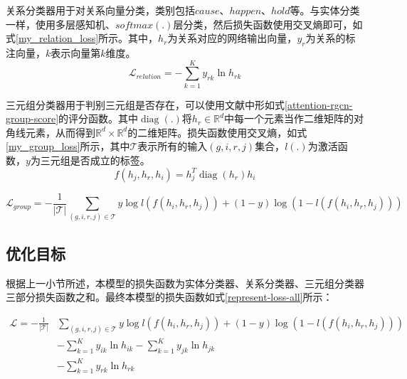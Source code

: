 关系分类器用于对关系向量分类，类别包括$cause$、$happen$、$hold$等。与实体分类一样，使用多层感知机、$softmax(.)$层分类，然后损失函数使用交叉熵即可，如式\ref{my_relation_loss}所示。其中，$h_r$为关系对应的网络输出向量，$y_r$为关系的标注向量，$k$表示向量第$k$维度。
\begin{equation}
    \mathcal{L}_{relation}=- \sum_{k=1}^{K} y_{r k} \ln h_{r k}
    \label{my_relation_loss}
\end{equation}

三元组分类器用于判别三元组是否存在，可以使用文献\parencite{trouillon2016complex}中形如式\ref{attention-rgcn-group-score}的评分函数。其中$\operatorname{diag}\left(.\right)$将$h_r\in\mathbb{R}^{d}$中每一个元素当作二维矩阵的对角线元素，从而得到$\mathbb{R}^{d}\times \mathbb{R}^{d}$的二维矩阵。损失函数使用交叉熵，如式\ref{my_group_loss}所示，其中$\mathcal{T}$表示所有的输入$(g, i, r, j)$集合，$l(.)$为激活函数，$y$为三元组是否成立的标签。
\begin{equation}
    f(h_{j}, h_{r}, h_{i})=h_{j}^{T} \operatorname{diag}\left(h_{r}\right) h_{i}
    \label{attention-rgcn-group-score}
\end{equation}

\begin{equation}
    \mathcal{L}_{group}= -\frac{1}{|\mathcal{T}|}  \sum_{(g, i, r, j) \in \mathcal{T}} y \log l(f(h_i, h_r, h_j))+(1-y) \log (1-l(f(h_i, h_r, h_j)))
    \label{my_group_loss}
\end{equation}

\subsection{优化目标}\label{representation-paras-learn}
根据上一小节所述，本模型的损失函数为实体分类器、关系分类器、三元组分类器三部分损失函数之和。最终本模型的损失函数如式\ref{represent-loss-all}所示：

\begin{equation}
    \begin{aligned}
    \mathcal{L}=-\frac{1}{|\mathcal{T}|}&  \sum_{(g, i, r, j) \in \mathcal{T}} y \log l(f(h_i, h_r, h_j))+(1-y) \log (1-l(f(h_i, h_r, h_j)))\\
    &- \sum_{k=1}^{K} y_{i k} \ln h_{i k} - \sum_{k=1}^{K} y_{j k} \ln h_{j k}\\
    &- \sum_{k=1}^{K} y_{r k} \ln h_{r k}\\
    \end{aligned}
    \label{represent-loss-all}
\end{equation}

